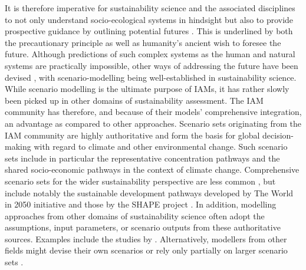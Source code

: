 \documentclass{article}
\begin{document}
\begin{refsection}
It is therefore imperative for sustainability science and the associated disciplines to not only understand socio-ecological systems in hindsight \parencite{kates_2001} but also to provide prospective guidance by outlining potential futures \parencite{swart_2004}. This is underlined by both the precautionary principle\footnotemark{} as well as humanity's ancient wish to foresee the future. Although predictions of such complex systems as the human and natural systems are practically impossible, other ways of addressing the future have been devised \parencite{polasky_2011}, with scenario-modelling being well-established in sustainability science. While scenario modelling is the ultimate purpose of IAMs, it has rather slowly been picked up in other domains of sustainability assessment. The IAM community has therefore, and because of their models' comprehensive integration, an advantage as compared to other approaches. Scenario sets originating from the IAM community are highly authoritative and form the basis for global decision-making with regard to climate and other environmental change. Such scenario sets include in particular the representative concentration pathways \parencite[RCPs;][]{vanvuuren_2011_rcp} and the shared socio-economic pathways \parencite[SSPs;][]{riahi_2017,oneill_2014} in the context of climate change. Comprehensive scenario sets for the wider sustainability perspective are less common \parencite{vansoest_2019}, but include notably the sustainable development pathways developed by The World in 2050 initiative \parencite{twi_2018} and those by the SHAPE project \parencite[e.g.][]{soergel_2021}. In addition, modelling approaches from other domains of sustainability science often adopt the assumptions, input parameters, or scenario outputs from these authoritative sources. Examples include the studies by \textcite{deetman_2018,beltran_2020,schandl_2020}. Alternatively, modellers from other fields might devise their own scenarios or rely only partially on larger scenario sets \parencite[for example][]{pauliuk_2013}.



\end{refsection}
\end{document}
